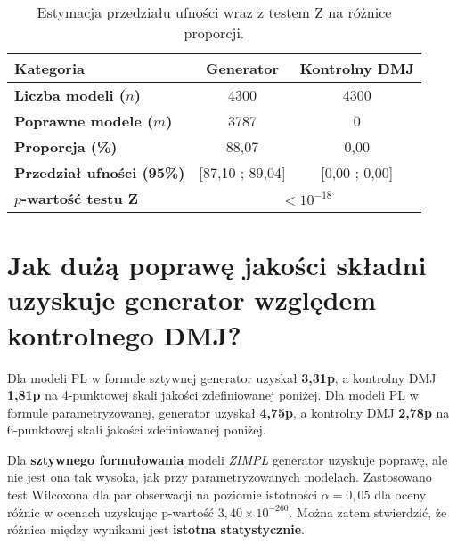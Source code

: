 \begin{table}[H]
\caption{Estymacja przedziału ufności wraz z testem Z na różnice proporcji.}\label{tab:experiment:analysis4}
\centering%
\begin{tabular}{|l|c|c|}
\hline
\textbf{Kategoria} & \textbf{Generator} & \textbf{Kontrolny DMJ} \\
\hline
\textbf{Liczba modeli ($n$)} & 4300 & 4300 \\
\hline
\textbf{Poprawne modele ($m$)} & 3787 & 0 \\
\hline
\textbf{Proporcja (\%)} & 88,07 & 0,00 \\
\hline
\textbf{Przedział ufności (95\%)} & [87,10 ; 89,04] & [0,00 ; 0,00] \\
\hline
\textbf{$p$-wartość testu Z}&\multicolumn{2}{c|}{$<10^{-18}$}\\
\hline
\end{tabular}
\end{table}

\section{Jak dużą poprawę jakości składni uzyskuje generator względem kontrolnego DMJ?}

Dla modeli PL w formule sztywnej generator uzyskał \textbf{3,31p}, a kontrolny DMJ \textbf{1,81p} na 4\nobreakdash-punktowej skali jakości zdefiniowanej poniżej. Dla modeli PL w formule parametryzowanej, generator uzyskał \textbf{4,75p}, a kontrolny DMJ \textbf{2,78p} na 6-punktowej skali jakości zdefiniowanej poniżej.

Dla \textbf{sztywnego formułowania} modeli \textit{ZIMPL} generator uzyskuje poprawę, ale nie jest ona tak wysoka, jak przy parametryzowanych modelach. %
Zastosowano test Wilcoxona dla par obserwacji na poziomie istotności $\alpha=0,05$ dla oceny różnic w ocenach uzyskując p-wartość \( 3{,}40 \times 10^{-260} \). Można zatem stwierdzić, że różnica między wynikami jest \textbf{istotna statystycznie}.

